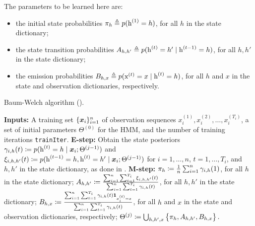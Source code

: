 The parameters to be learned here are:
\begin{itemize}
    \item the initial state probabilities ${\pi}_h \triangleq p({\textnormal{h}}^{(1)}=h)$, for all $h$ in the state dictionary;
    \item the state transition probabilities ${A}_{h,h'} \triangleq p({\textnormal{h}}^{(t)}=h' \mid {\textnormal{h}}^{(t-1)}=h)$, for all $h,h'$ in the state dictionary;
    \item the emission probabilities ${B}_{h,x} \triangleq p({\textnormal{x}}^{(t)}=x \mid {\textnormal{h}}^{(t)}=h)$, for all $h$ and $x$ in the state and observation dictionaries, respectively.
\end{itemize}

\begin{algorithm}
    \caption{Baum-Welch algorithm (\citet{Baum1972}).}
    \label{alg:baum_welch}
    \begin{algorithmic}[1]
        \State \textbf{Inputs:} A training set $\lbrace {\bm{x}}_i \rbrace_{i=1}^n$ of observation sequences $x_i^{(1)}, x_i^{(2)}, \dots, x_i^{(T_i)}$, a set of initial parameters $\Theta^{(0)}$ for the HMM, and the number of training iterations \texttt{trainIter}.
        \vspace{0.01cm}
        \vspace{0.3cm}
        \State \textbf{E-step:}
        \vspace{0.3cm}
        \Indent
        \State Obtain the state posteriors $\gamma_{i,h}(t) \coloneqq p({\textnormal{h}}^{(t)}=h \mid {\bm{x}}_i; \Theta^{(j-1)})$ and $\xi_{i,h,h'}(t) \coloneqq p({\textnormal{h}}^{(t-1)}=h, {\textnormal{h}}^{(t)}=h' \mid {\bm{x}}_i; \Theta^{(j-1)})$ for $i=1,\dots,n$, $t=1,\dots,T_i$, and $h,h'$ in the state dictionary, as done in .
        \vspace{0.3cm}
        \EndIndent
        \State \textbf{M-step:}
        \vspace{0.3cm}
        \Indent
        \State ${\pi}_h \coloneqq \frac{1}{n} \sum_{i=1}^n \gamma_{i,h}(1)$, for all $h$ in the state dictionary;
        \vspace{0.3cm}
        \State ${A}_{h,h'} \coloneqq \frac{\sum_{i=1}^n \sum_{t=1}^{T_i}\xi_{i,h,h'}(t)}{\sum_{i=1}^n \sum_{t=1}^{T_i} \gamma_{i,h}(t)}$, for all $h,h'$ in the state dictionary;
        \vspace{0.3cm}
        \State ${B}_{h,x} \coloneqq \frac{\sum_{i=1}^n \sum_{t=1}^{T_i} \gamma_{i,h}(t) \bm{1}_{x_i^{(t)}=x}}{\sum_{i=1}^n \sum_{t=1}^{T_i} \gamma_{i,h}(t)}$, for all $h$ and $x$ in the state and observation dictionaries, respectively;
        \vspace{0.3cm}
        \State $\Theta^{(j)} \coloneqq \bigcup_{h,h',x} \left\lbrace {\pi}_h, {A}_{h,h'}, {B}_{h,x} \right\rbrace.$
        \EndIndent
        \EndFor
    \end{algorithmic}
\end{algorithm}


